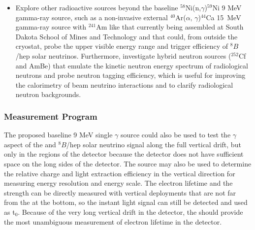 \begin{itemize}
\item Explore other radioactive sources beyond the baseline $^{58}$Ni(n,$\gamma$)$^{59}$Ni 9 MeV gamma-ray source, such as a non-invasive external $^{40}$Ar($\alpha,\,\gamma$)$^{44}$Ca 15~MeV gamma-ray source with $^{241}$Am like that currently being assembled at South Dakota School of Mines and Technology and that could, from outside the cryostat, probe the upper visible energy range and trigger efficiency of $^{8}B$/hep solar neutrinos. Furthermore, investigate hybrid neutron sources ($^{252}$Cf and AmBe) that emulate the kinetic neutron energy spectrum of radiological neutrons and probe neutron tagging efficiency, which is useful for improving the calorimetry of beam neutrino interactions and to clarify radiological neutron backgrounds. 
\end{itemize}

\subsubsection{Measurement Program}
\label{sec:sp-calib-sys-src-dep-meas}
The proposed baseline 9 MeV single $\gamma$ source could also be used to test the $\gamma$ aspect of the  and $^{8}B$/hep solar neutrino signal 
along the full vertical drift, but only in the \endwall regions of the detector because the detector does not have sufficient space on the long sides of the detector. 
The source may also be used to determine the relative charge and light extraction efficiency in the vertical direction for measuring energy resolution and energy scale. The electron lifetime and the \efield strength can be directly measured with vertical deployments that are not far from the  at the bottom, so the instant light signal can still be detected and used as t$_0$. Because of the very long vertical drift in the  detector, the  should provide the most unambiguous measurement of electron lifetime in the  detector.


